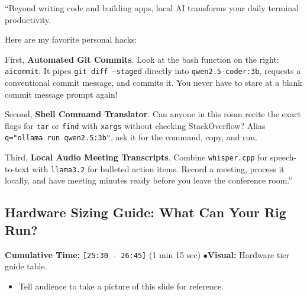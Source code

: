 \documentclass[11pt,a4paper]{article}
\begin{document}
\begin{speechbox}
``Beyond writing code and building apps, local AI transforms your daily terminal productivity.

Here are my favorite personal hacks:

First, \textbf{Automated Git Commits}. Look at the bash function on the right: \texttt{aicommit}. It pipes \texttt{git diff --staged} directly into \texttt{qwen2.5-coder:3b}, requests a conventional commit message, and commits it. You never have to stare at a blank commit message prompt again!

Second, \textbf{Shell Command Translator}. Can anyone in this room recite the exact flags for \texttt{tar} or \texttt{find} with \texttt{xargs} without checking StackOverflow? Alias \texttt{q="ollama run qwen2.5:3b"}, ask it for the command, copy, and run.

Third, \textbf{Local Audio Meeting Transcripts}. Combine \texttt{whisper.cpp} for speech-to-text with \texttt{llama3.2} for bulleted action items. Record a meeting, process it locally, and have meeting minutes ready before you leave the conference room.''
\end{speechbox}

\subsection{Hardware Sizing Guide: What Can Your Rig Run?}
\begin{directionbox}
    \textbf{Cumulative Time:} \texttt{[25:30 - 26:45]} (1 min 15 sec) \quad$\bullet$\quad \textbf{Visual:} Hardware tier guide table.
    \begin{itemize}
        \item Tell audience to take a picture of this slide for reference.
    \end{itemize}
\end{directionbox}
\end{document}

